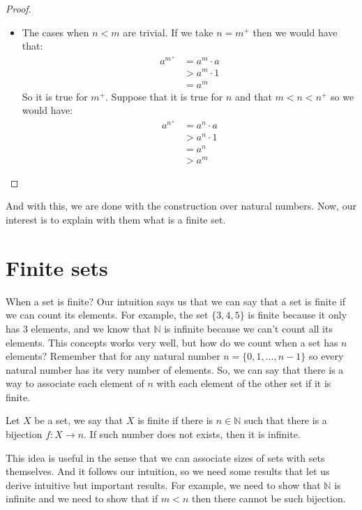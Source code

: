 \documentclass{tufte-handout}
\begin{document}
\begin{proof}
\begin{itemize}
		\item The cases when $n < m$ are trivial. If we take $n = m^+$ then we would have that:
		\begin{align*}
			a^{m^+} &= a^m \cdot a\\
			&> a^m \cdot 1\\
			&= a^m
		\end{align*}
		So it is true for $m^+$. Suppose that it is true for $n$ and that $m < n < n^+$ so we would have:
		\begin{align*}
			a^{n^+} &= a^n \cdot a\\
			&> a^n \cdot 1\\
			&= a^n\\
			&> a^m
		\end{align*}
	\end{itemize}
\end{proof}

And with this, we are done with the construction over natural numbers. Now, our interest is to explain with them what is a finite set.

\section{Finite sets}
When a set is finite? Our intuition says us that we can say that a set is finite if we can count its elements. For example, the set $\{3, 4, 5\}$ is finite because it only has 3 elements, and we know that $\mathbb{N}$ is infinite because we can't count all its elements. This concepts works very well, but how do we count when a set has $n$ elements? Remember that for any natural number $n = \{0, 1, \dots, n-1\}$ so every natural number has its very number of elements. So, we can say that there is a way to associate each element of $n$ with each element of the other set if it is finite.

\begin{definition}
	Let $X$ be a set, we say that $X$ is finite if there is $n \in \mathbb{N}$ such that there is a bijection $f: X \to n$. If such number does not exists, then it is infinite.
\end{definition}

This idea is useful in the sense that we can associate sizes of sets with sets themselves. And it follows our intuition, so we need some results that let us derive intuitive but important results. For example, we need to show that $\mathbb{N}$ is infinite and we need to show that if $m < n$ then there cannot be such bijection.
\end{document}

